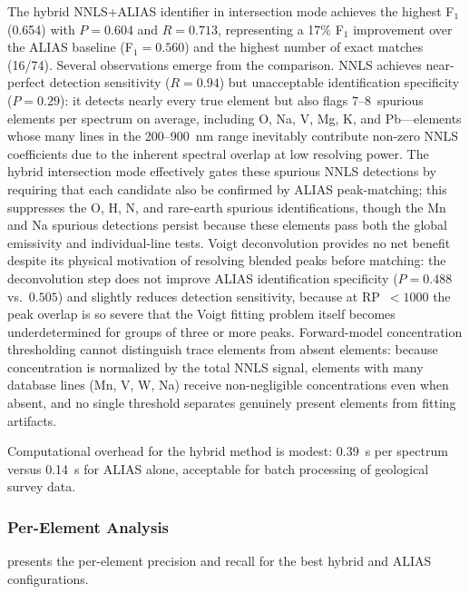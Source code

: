 The hybrid NNLS+ALIAS identifier in intersection mode achieves the highest F$_1$ (0.654) with $P = 0.604$ and $R = 0.713$, representing a 17\% F$_1$ improvement over the ALIAS baseline (F$_1 = 0.560$) and the highest number of exact matches (16/74).
Several observations emerge from the comparison.
NNLS achieves near-perfect detection sensitivity ($R = 0.94$) but unacceptable identification specificity ($P = 0.29$): it detects nearly every true element but also flags 7--8~spurious elements per spectrum on average, including O, Na, V, Mg, K, and Pb---elements whose many lines in the 200--900~nm range inevitably contribute non-zero NNLS coefficients due to the inherent spectral overlap at low resolving power.
The hybrid intersection mode effectively gates these spurious NNLS detections by requiring that each candidate also be confirmed by ALIAS peak-matching; this suppresses the O, H, N, and rare-earth spurious identifications, though the Mn and Na spurious detections persist because these elements pass both the global emissivity and individual-line tests.
Voigt deconvolution provides no net benefit despite its physical motivation of resolving blended peaks before matching: the deconvolution step does not improve ALIAS identification specificity ($P = 0.488$ vs.\ $0.505$) and slightly reduces detection sensitivity, because at RP~$< 1000$ the peak overlap is so severe that the Voigt fitting problem itself becomes underdetermined for groups of three or more peaks.
Forward-model concentration thresholding cannot distinguish trace elements from absent elements: because concentration is normalized by the total NNLS signal, elements with many database lines (Mn, V, W, Na) receive non-negligible concentrations even when absent, and no single threshold separates genuinely present elements from fitting artifacts.

Computational overhead for the hybrid method is modest: 0.39~s per spectrum versus 0.14~s for ALIAS alone, acceptable for batch processing of geological survey data.

\subsubsection{Per-Element Analysis}

 presents the per-element precision and recall for the best hybrid and ALIAS configurations.

